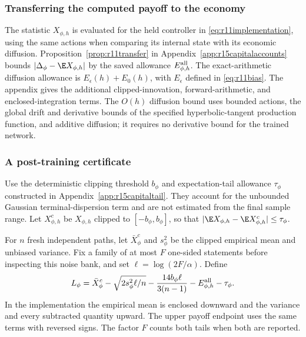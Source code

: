\subsubsection{Transferring the computed payoff to the economy}
The statistic $X_{\phi,h}$ is evaluated for the held controller in
\eqref{eq:r11implementation}, using the same actions when comparing its
internal state with its economic diffusion. Proposition~\ref{prop:r11transfer}
in Appendix~\ref{app:r15capitalaccounts} bounds
$|\Delta_\phi-\E X_{\phi,h}|$ by the saved allowance
$E_{\phi,h}^{\rm all}$. The exact-arithmetic diffusion allowance is
$E_\epsilon(h)+E_0(h)$, with $E_\epsilon$ defined in
\eqref{eq:r11bias}. The appendix gives the additional clipped-innovation,
forward-arithmetic, and enclosed-integration terms. The $O(h)$ diffusion
bound uses bounded actions, the global drift and derivative bounds of the
specified hyperbolic-tangent production function, and additive diffusion;
it requires no derivative bound for the trained network.

\subsubsection{A post-training certificate}
Use the deterministic clipping threshold $b_\phi$ and expectation-tail
allowance $\tau_\phi$ constructed in
Appendix~\ref{app:r15capitaltail}. They account for the unbounded Gaussian
terminal-dispersion term and are not estimated from the final sample range.
Let $X^c_{\phi,h}$ be $X_{\phi,h}$ clipped to
$[-b_\phi,b_\phi]$, so that
$|\E X_{\phi,h}-\E X^c_{\phi,h}|\leq\tau_\phi$.

For $n$ fresh independent paths, let $\bar X^c_\phi$ and $s^2_\phi$ be the clipped empirical mean and unbiased variance. Fix a family of at most $F$ one-sided statements before inspecting this noise bank, and set $\ell=\log(2F/\alpha)$. Define
\begin{equation}\label{eq:r11lower}
 L_\phi=\bar X^c_\phi-
     \sqrt{2s_\phi^2\ell/n}-\frac{14b_\phi\ell}{3(n-1)}
     -E_{\phi,h}^{\rm all}-\tau_\phi.
\end{equation}
In the implementation the empirical mean is enclosed downward and the variance and every subtracted quantity upward. The upper payoff endpoint uses the same terms with reversed signs. The factor $F$ counts both tails when both are reported.

